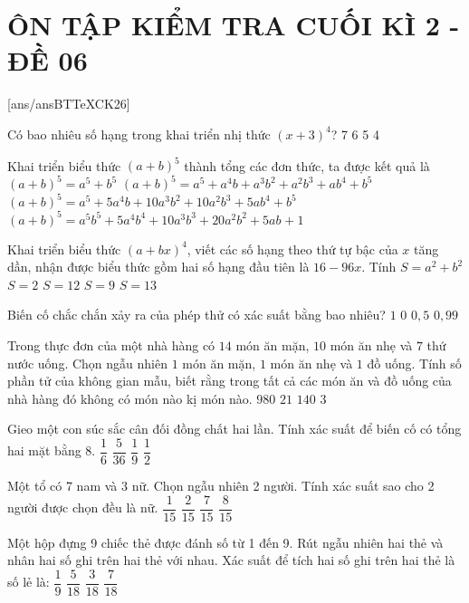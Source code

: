 \section*{ÔN TẬP KIỂM TRA CUỐI KÌ 2 - ĐỀ 06}
\setcounter{ex}{0}\setcounter{bt}{0}
[ans/ansBTTeXCK26]
\begin{ex}
Có bao nhiêu số hạng trong khai triển nhị thức $(x+3)^4$?
\choice
{7}
{6}
{5}
{4}
\end{ex}
\begin{ex}
Khai triển biểu thức ${{(a+b)}^5}$ thành tổng các đơn thức, ta được kết quả là
\choice
{${{(a+b)}^5}=a^5+b^5$}
{${{(a+b)}^5}=a^5+a^4b+a^3b^2+a^2b^3+ab^4+b^5$}
{${{(a+b)}^5}=a^5+5a^4b+10a^3b^2+10a^2b^3+5ab^4+b^5$}
{${{(a+b)}^5}=a^5b^5+5a^4b^4+10a^3b^3+20a^2b^2+5ab^{}+1$}
\end{ex}
\begin{ex}
Khai triển biểu thức ${{(a+bx)}^4}$, viết các số hạng theo thứ tự bậc của $x$ tăng dần, nhận được biểu thức gồm hai số hạng đầu tiên là $16-96x$. Tính $S=a^2+b^2$
\choice
{$S=2$}
{$S=12$}
{$S=9$}
{$S=13$}
\end{ex}
\begin{ex}
Biến cố chắc chắn xảy ra của phép thử có xác suất bằng bao nhiêu?
\choice
{$1$}
{$0$}
{$0{,}5$}
{$0{,}99$}
\end{ex}
\begin{ex}
Trong thực đơn của một nhà hàng có $14$ món ăn mặn, $10$ món ăn nhẹ và $7$ thứ nước uống. Chọn ngẫu nhiên $1$ món ăn mặn, $1$ món ăn nhẹ và $1$ đồ uống. Tính số phần tử của không gian mẫu, biết rằng trong tất cả các món ăn và đồ uống của nhà hàng đó không có món nào kị món nào.
\choice
{$980$}
{$21$}
{$140$}
{$3$}
\end{ex}
\begin{ex}
Gieo một con súc sắc cân đối đồng chất hai lần. Tính xác suất để biến cố có tổng hai mặt bằng 8.
\choice
{$\dfrac{1}{6}$}
{$\dfrac{5}{36}$}
{$\dfrac{1}{9}$}
{$\dfrac{1}{2}$}
\end{ex}
\begin{ex}
Một tổ có 7 nam và 3 nữ. Chọn ngẫu nhiên 2 người. Tính xác suất sao cho 2 người được chọn đều là nữ.
\choice
{$\dfrac{1}{15}$}
{$\dfrac{2}{15}$}
{$\dfrac{7}{15}$}
{$\dfrac{8}{15}$}
\end{ex}
\begin{ex}
Một hộp đựng 9 chiếc thẻ được đánh số từ 1 đến 9. Rút ngẫu nhiên hai thẻ và nhân hai số ghi trên hai thẻ với nhau. Xác suất để tích hai số ghi trên hai thẻ là số lẻ là:
\choice
{${\dfrac{1}{9}}$}
{${\dfrac{5}{18}}$}
{${\dfrac{3}{18}}$}
{${\dfrac{7}{18}}$}
\end{ex}
